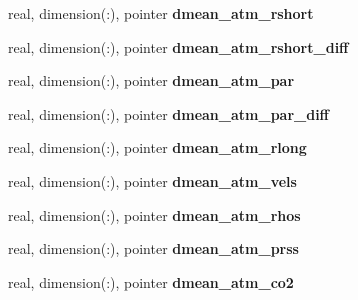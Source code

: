 \begin{DoxyCompactItemize}
\item 
\hypertarget{structed__state__vars_1_1edtype_a44fa85f25d89034409186e35bee5a3de}{
real, dimension(:), pointer {\bfseries dmean\_\-atm\_\-rshort}}
\label{structed__state__vars_1_1edtype_a44fa85f25d89034409186e35bee5a3de}

\item 
\hypertarget{structed__state__vars_1_1edtype_a95dd0bee8d80546e2ba7eec787b20727}{
real, dimension(:), pointer {\bfseries dmean\_\-atm\_\-rshort\_\-diff}}
\label{structed__state__vars_1_1edtype_a95dd0bee8d80546e2ba7eec787b20727}

\item 
\hypertarget{structed__state__vars_1_1edtype_af430a8951c7a457834827bcdc959c021}{
real, dimension(:), pointer {\bfseries dmean\_\-atm\_\-par}}
\label{structed__state__vars_1_1edtype_af430a8951c7a457834827bcdc959c021}

\item 
\hypertarget{structed__state__vars_1_1edtype_a6fa16fdb195a1e29d3bfccc8346a8031}{
real, dimension(:), pointer {\bfseries dmean\_\-atm\_\-par\_\-diff}}
\label{structed__state__vars_1_1edtype_a6fa16fdb195a1e29d3bfccc8346a8031}

\item 
\hypertarget{structed__state__vars_1_1edtype_a783a094ae0941634e83a758fd8a8c9d2}{
real, dimension(:), pointer {\bfseries dmean\_\-atm\_\-rlong}}
\label{structed__state__vars_1_1edtype_a783a094ae0941634e83a758fd8a8c9d2}

\item 
\hypertarget{structed__state__vars_1_1edtype_a3cca5eb6c6b603b575e01ed4e6e87715}{
real, dimension(:), pointer {\bfseries dmean\_\-atm\_\-vels}}
\label{structed__state__vars_1_1edtype_a3cca5eb6c6b603b575e01ed4e6e87715}

\item 
\hypertarget{structed__state__vars_1_1edtype_a6985ca4ddee6ba83b0f0af73e42b2142}{
real, dimension(:), pointer {\bfseries dmean\_\-atm\_\-rhos}}
\label{structed__state__vars_1_1edtype_a6985ca4ddee6ba83b0f0af73e42b2142}

\item 
\hypertarget{structed__state__vars_1_1edtype_ae776c18bb40fc52e878a1a2e70dc9eb1}{
real, dimension(:), pointer {\bfseries dmean\_\-atm\_\-prss}}
\label{structed__state__vars_1_1edtype_ae776c18bb40fc52e878a1a2e70dc9eb1}

\item 
\hypertarget{structed__state__vars_1_1edtype_a1004f8c79a509470ec4cbd82b3307db5}{
real, dimension(:), pointer {\bfseries dmean\_\-atm\_\-co2}}
\label{structed__state__vars_1_1edtype_a1004f8c79a509470ec4cbd82b3307db5}


\end{DoxyCompactItemize}

